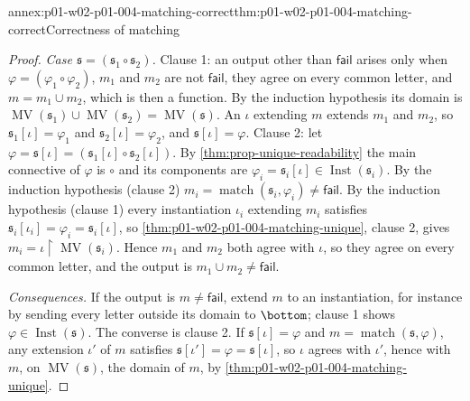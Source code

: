 \begin{annexitem}{annex:p01-w02-p01-004-matching-correct}{thm:p01-w02-p01-004-matching-correct}{Correctness of matching}
\begin{proof}
\emph{Case \(\mathfrak s=(\mathfrak s_1\circ\mathfrak s_2)\).} Clause 1: an
output other than \(\mathsf{fail}\) arises only when
\(\varphi=(\varphi_1\circ\varphi_2)\), \(m_1\) and \(m_2\) are not
\(\mathsf{fail}\), they agree on every common letter, and \(m=m_1\cup m_2\),
which is then a function. By the induction hypothesis its domain is
\(\operatorname{MV}(\mathfrak s_1)\cup\operatorname{MV}(\mathfrak
s_2)=\operatorname{MV}(\mathfrak s)\). An \(\iota\) extending \(m\) extends
\(m_1\) and \(m_2\), so \(\mathfrak s_1[\iota]=\varphi_1\) and
\(\mathfrak s_2[\iota]=\varphi_2\), and \(\mathfrak s[\iota]=\varphi\).
Clause 2: let \(\varphi=\mathfrak s[\iota]=(\mathfrak s_1[\iota]\circ
\mathfrak s_2[\iota])\). By \cref{thm:prop-unique-readability} the main
connective of \(\varphi\) is \(\circ\) and its components are
\(\varphi_i=\mathfrak s_i[\iota]\in\operatorname{Inst}(\mathfrak s_i)\). By the
induction hypothesis (clause 2) \(m_i=\operatorname{match}(\mathfrak
s_i,\varphi_i)\ne\mathsf{fail}\). By the induction hypothesis (clause 1) every
instantiation \(\iota_i\) extending \(m_i\) satisfies \(\mathfrak
s_i[\iota_i]=\varphi_i=\mathfrak s_i[\iota]\), so
\cref{thm:p01-w02-p01-004-matching-unique}, clause 2, gives
\(m_i=\iota\mathbin{\upharpoonright}\operatorname{MV}(\mathfrak s_i)\). Hence \(m_1\) and
\(m_2\) both agree with \(\iota\), so they agree on every common letter, and
the output is \(m_1\cup m_2\ne\mathsf{fail}\).

\emph{Consequences.} If the output is \(m\ne\mathsf{fail}\), extend \(m\) to an
instantiation, for instance by sending every letter outside its domain to
\(\bottom\); clause 1 shows \(\varphi\in\operatorname{Inst}(\mathfrak s)\).
The converse is clause 2. If \(\mathfrak s[\iota]=\varphi\) and
\(m=\operatorname{match}(\mathfrak s,\varphi)\), any extension \(\iota'\) of
\(m\) satisfies \(\mathfrak s[\iota']=\varphi=\mathfrak s[\iota]\), so
\(\iota\) agrees with \(\iota'\), hence with \(m\), on
\(\operatorname{MV}(\mathfrak s)\), the domain of \(m\), by
\cref{thm:p01-w02-p01-004-matching-unique}.
\end{proof}
\end{annexitem}


